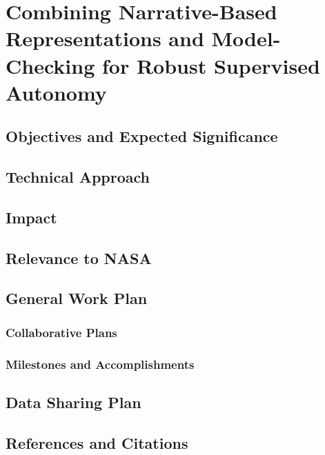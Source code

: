 \documentclass[palatinofont10]{nsfprop}
\begin{document}
\section{\large Combining Narrative-Based Representations and Model-Checking for Robust Supervised Autonomy}


\vspace{-1ex}
\subsection{Objectives and Expected Significance}

\vspace{-1ex}
\subsection{Technical Approach}

\vspace{-1ex}
\subsection{Impact}

\vspace{-1ex}
\subsection{Relevance to NASA}

\vspace{-1ex}
\subsection{General Work Plan}
\subsubsection{Collaborative Plans}
\subsubsection{Milestones and Accomplishments}

\vspace{-1ex}
\subsection{Data Sharing Plan}

\clearpage
\subsection{References and Citations}
\setcounter{page}{1}

\end{document}
